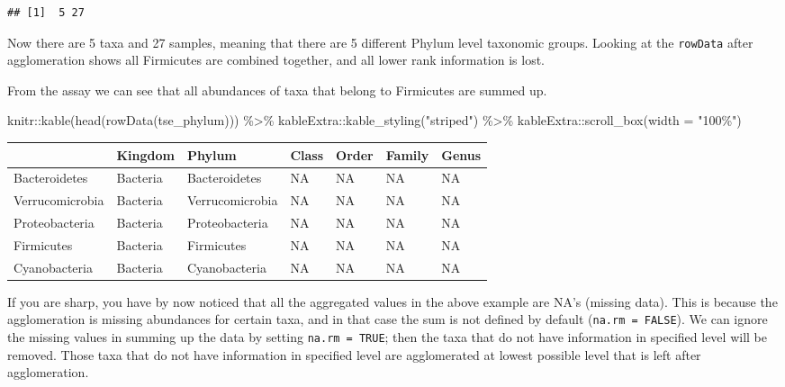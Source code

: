 \documentclass[
]{book}
\newenvironment{Shaded}{\begin{snugshade}}{\end{snugshade}}
\newcommand{\AttributeTok}[1]{\textcolor[rgb]{0.77,0.63,0.00}{#1}}
\newcommand{\FunctionTok}[1]{\textcolor[rgb]{0.00,0.00,0.00}{#1}}
\newcommand{\NormalTok}[1]{#1}
\newcommand{\SpecialCharTok}[1]{\textcolor[rgb]{0.00,0.00,0.00}{#1}}
\newcommand{\StringTok}[1]{\textcolor[rgb]{0.31,0.60,0.02}{#1}}
\begin{document}
\begin{verbatim}
## [1]  5 27
\end{verbatim}

Now there are 5 taxa and 27
samples, meaning that there are 5 different
Phylum level taxonomic groups. Looking at the \texttt{rowData} after
agglomeration shows all Firmicutes are combined together, and all
lower rank information is lost.

From the assay we can see that all abundances of taxa that belong to
Firmicutes are summed up.

\begin{Shaded}
\begin{Highlighting}[]
\NormalTok{knitr}\SpecialCharTok{::}\FunctionTok{kable}\NormalTok{(}\FunctionTok{head}\NormalTok{(}\FunctionTok{rowData}\NormalTok{(tse\_phylum))) }\SpecialCharTok{\%\textgreater{}\%}\NormalTok{ kableExtra}\SpecialCharTok{::}\FunctionTok{kable\_styling}\NormalTok{(}\StringTok{"striped"}\NormalTok{) }\SpecialCharTok{\%\textgreater{}\%} 
\NormalTok{  kableExtra}\SpecialCharTok{::}\FunctionTok{scroll\_box}\NormalTok{(}\AttributeTok{width =} \StringTok{"100\%"}\NormalTok{)}
\end{Highlighting}
\end{Shaded}

\begin{table}
\centering
\begin{tabular}{l|l|l|l|l|l|l}
\hline
  & Kingdom & Phylum & Class & Order & Family & Genus\\
\hline
Bacteroidetes & Bacteria & Bacteroidetes & NA & NA & NA & NA\\
\hline
Verrucomicrobia & Bacteria & Verrucomicrobia & NA & NA & NA & NA\\
\hline
Proteobacteria & Bacteria & Proteobacteria & NA & NA & NA & NA\\
\hline
Firmicutes & Bacteria & Firmicutes & NA & NA & NA & NA\\
\hline
Cyanobacteria & Bacteria & Cyanobacteria & NA & NA & NA & NA\\
\hline
\end{tabular}
\end{table}

If you are sharp, you have by now noticed that all the aggregated
values in the above example are NA's (missing data). This is because
the agglomeration is missing abundances for certain taxa, and in that
case the sum is not defined by default (\texttt{na.rm\ =\ FALSE}). We can
ignore the missing values in summing up the data by setting \texttt{na.rm\ =\ TRUE}; then the taxa that do not have information in specified level
will be removed. Those taxa that do not have information in specified
level are agglomerated at lowest possible level that is left after
agglomeration.
\end{document}
